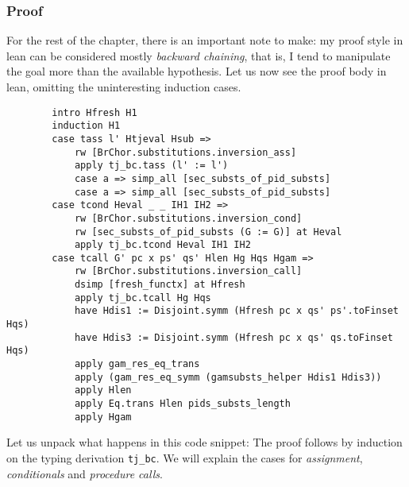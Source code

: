 \documentclass[12pt,a4paper,twoside]{book}
\begin{document}
\subsubsection{Proof}
For the rest of the chapter, there is an important note to make: my proof style in lean can be considered mostly \emph{backward chaining}\cite{al2015comparison}, that is, I tend to manipulate the goal more than the available hypothesis.
Let us now see the proof body in lean, omitting the uninteresting induction cases.
\begin{samepage}
\begin{verbatim}
        intro Hfresh H1
        induction H1
        case tass l' Htjeval Hsub =>
            rw [BrChor.substitutions.inversion_ass]
            apply tj_bc.tass (l' := l')
            case a => simp_all [sec_substs_of_pid_substs]
            case a => simp_all [sec_substs_of_pid_substs]
        case tcond Heval _ _ IH1 IH2 =>
            rw [BrChor.substitutions.inversion_cond]
            rw [sec_substs_of_pid_substs (G := G)] at Heval
            apply tj_bc.tcond Heval IH1 IH2
        case tcall G' pc x ps' qs' Hlen Hg Hqs Hgam =>
            rw [BrChor.substitutions.inversion_call]
            dsimp [fresh_functx] at Hfresh
            apply tj_bc.tcall Hg Hqs
            have Hdis1 := Disjoint.symm (Hfresh pc x qs' ps'.toFinset Hqs)
            have Hdis3 := Disjoint.symm (Hfresh pc x qs' qs.toFinset Hqs)
            apply gam_res_eq_trans
            apply (gam_res_eq_symm (gamsubsts_helper Hdis1 Hdis3))
            apply Hlen
            apply Eq.trans Hlen pids_substs_length
            apply Hgam
\end{verbatim}
\end{samepage}
Let us unpack what happens in this code snippet: The proof follows by induction on the typing derivation \texttt{tj\_bc}. We will explain the cases for \emph{assignment}, \emph{conditionals} and \emph{procedure calls}.
\end{document}
